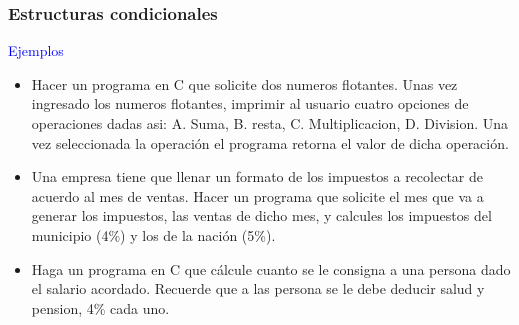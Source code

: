 \documentclass[10.5pt,scale=1.0,t,aspectratio=169,hyperref={pdfpagelabels=false}]{beamer}
\begin{document}
\begin{frame}
	\frametitle{Estructuras condicionales}
	\textcolor{blue}{\large Ejemplos} \\
	\begin{itemize}
		\item Hacer un programa en C que solicite dos numeros flotantes. Unas vez ingresado los numeros flotantes, imprimir al usuario cuatro opciones de operaciones dadas asi: A. Suma, B. resta, C. Multiplicacion, D. Division. Una vez seleccionada la operación el programa retorna el valor de dicha operación.
		\item Una empresa tiene que llenar un formato de los impuestos a recolectar de acuerdo al mes de ventas. Hacer un programa que solicite el mes que va a generar los impuestos, las ventas de dicho mes, y calcules los impuestos del municipio (4\%) y los de la nación (5\%). 
		\item Haga un programa en C que cálcule cuanto se le consigna a una persona dado el salario acordado. Recuerde que a las persona se le debe deducir salud y pension, 4\% cada uno. 
	\end{itemize}	
\end{frame}


\frame{
\begin{center}
	\LARGE \textcolor{blue}{CONCEPTOS BÁSICOS DE PROGRAMACIÓN EN C}
\end{center}

\begin{center}
	\LARGE \textcolor{blue}{GRACIAS}
\end{center}
}

\end{document}
